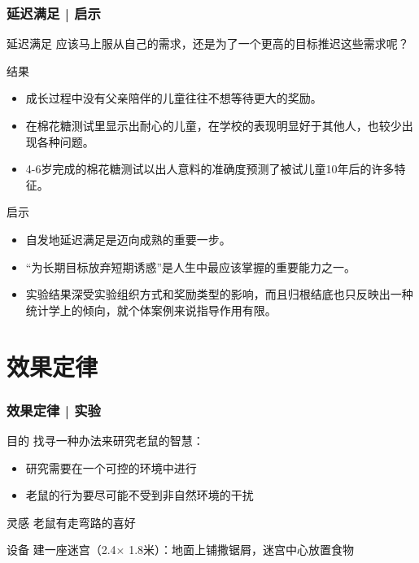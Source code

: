 \begin{frame}
  \frametitle{延迟满足 | 启示}
  \begin{block}{延迟满足}
    应该马上服从自己的需求，还是为了一个更高的目标推迟这些需求呢？
  \end{block}
  \vspace{-0.5em}
  \pause
  \begin{block}{结果}
    \begin{itemize}
      \item 成长过程中没有父亲陪伴的儿童往往不想等待更大的奖励。
      \item 在棉花糖测试里显示出耐心的儿童，在学校的表现明显好于其他人，也较少出现各种问题。
      \item 4-6岁完成的棉花糖测试以出人意料的准确度预测了被试儿童10年后的许多特征。
    \end{itemize}
  \end{block}
  \vspace{-0.5em}
  \pause
  \begin{block}{启示}
    \begin{itemize}
      \item 自发地延迟满足是迈向成熟的重要一步。
      \item “为长期目标放弃短期诱惑”是人生中最应该掌握的重要能力之一。
      \item 实验结果深受实验组织方式和奖励类型的影响，而且归根结底也只反映出一种统计学上的倾向，就个体案例来说指导作用有限。
    \end{itemize}
  \end{block}
\end{frame}

\section{效果定律}
\begin{frame}
  \frametitle{效果定律 | 实验}
  \begin{block}{目的}
    找寻一种办法来研究老鼠的智慧：
    \begin{itemize}
      \item 研究需要在一个可控的环境中进行
      \item 老鼠的行为要尽可能不受到非自然环境的干扰
    \end{itemize}
  \end{block}
  \pause
  \begin{block}{灵感}
    老鼠有走弯路的喜好
  \end{block}
  \pause
  \begin{block}{设备}
    建一座迷宫（2.4$\times$ 1.8米）：地面上铺撒锯屑，迷宫中心放置食物
  \end{block}
\end{frame}

